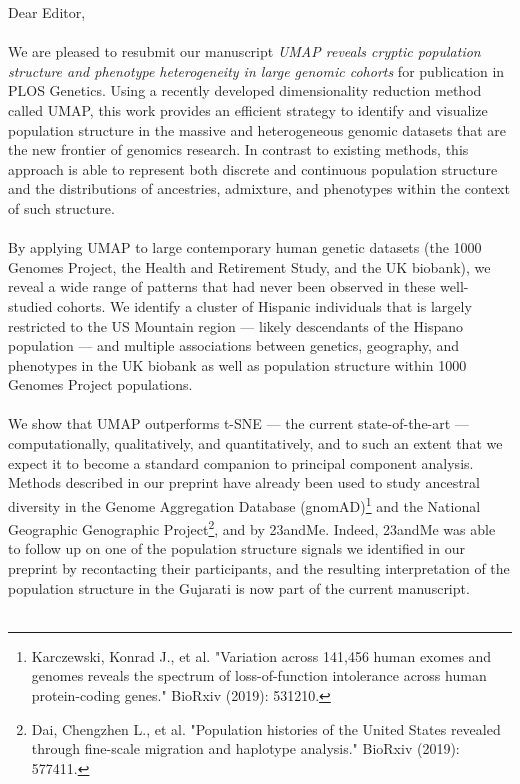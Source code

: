 \documentclass{article}
\begin{document}
Dear Editor,
\\\\
We are pleased to resubmit our manuscript \emph{UMAP reveals cryptic population structure and phenotype heterogeneity in large genomic cohorts} for publication in PLOS Genetics. Using a recently developed dimensionality reduction method called UMAP, this work provides an efficient strategy to identify and visualize population structure in the massive and heterogeneous genomic datasets that are the new frontier of genomics research. In contrast to existing methods, this approach is able to represent both discrete and continuous population structure and the distributions of ancestries, admixture, and phenotypes within the context of such structure.
\\\\
By applying UMAP to large contemporary human genetic datasets (the 1000 Genomes Project, the Health and Retirement Study, and the UK biobank), we reveal a wide range of patterns that had never been observed in these well-studied cohorts. We identify a cluster of Hispanic individuals that is largely restricted to the US Mountain region --- likely descendants of the Hispano population --- and  multiple associations between genetics, geography, and phenotypes in the UK biobank as well as population structure within 1000 Genomes Project populations.
\\\\
We show that UMAP outperforms t-SNE --- the current state-of-the-art --- computationally, qualitatively, and quantitatively, and to such an extent that we expect it to become a standard companion to principal component analysis.
Methods described in our preprint have already been used to study ancestral diversity in the Genome Aggregation Database (gnomAD)\footnote{Karczewski, Konrad J., et al. "Variation across 141,456 human exomes and genomes reveals the spectrum of loss-of-function intolerance across human protein-coding genes." BioRxiv (2019): 531210.} and the National Geographic Genographic Project\footnote{Dai, Chengzhen L., et al. "Population histories of the United States revealed through fine-scale migration and haplotype analysis." BioRxiv (2019): 577411.}, and by 23andMe. Indeed, 23andMe was able to follow up on one of the population structure signals we identified in our preprint by recontacting their participants, and the resulting interpretation of the population structure in the Gujarati is now part of the current manuscript. 
\\\\
\end{document}
